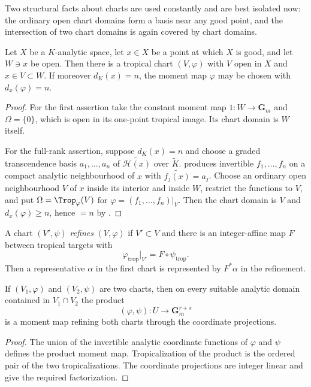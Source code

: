 Two structural facts about charts are used constantly and are best isolated
now: the ordinary open chart domains form a basis near any good point,
and the intersection of two chart domains is again covered by chart domains.

\begin{lemma}
\label{lem:trop-charts-basis}
Let $X$ be a $K$-analytic space, let $x\in X$ be a point at which $X$ is
good, and let $W\ni x$ be open. Then there is a tropical chart
$(V,\varphi)$ with $V$ open in $X$ and $x\in V\subset W$. If moreover
$d_K(x)=n$, the moment map
$\varphi$ may be chosen with $d_x(\varphi)=n$.
\end{lemma}

\begin{proof}
For the first assertion take the constant moment map $1:W\to\mathbf G_m$
and $\Omega=\{0\}$, which is open in its one-point tropical image. Its
chart domain is $W$ itself.

For the full-rank assertion, suppose $d_K(x)=n$ and choose a graded transcendence
basis $a_1,\ldots,a_n$ of $\widetilde{\mathcal H(x)}$ over $\widetilde K$.
 produces invertible
$f_1,\ldots,f_n$ on a compact analytic neighbourhood of $x$ with
$\widetilde{f_j(x)}=a_j$. Choose an ordinary open neighbourhood $V$ of $x$
inside its interior and inside $W$, restrict the functions to $V$, and put
$\Omega=\Trop_\varphi(V)$ for $\varphi=(f_1,\ldots,f_n)|_V$. Then the
chart domain is $V$ and $d_x(\varphi)\ge n$, hence $=n$ by
.
\end{proof}

\begin{definition}
\label{def:trop-chart-refinement}
A chart $(V',\psi)$ \emph{refines} $(V,\varphi)$ if $V'\subset V$ and there is
an integer-affine map $F$ between tropical targets with
\[
                         \varphi_{\mathrm{trop}}|_{V'}
                         =F\circ\psi_{\mathrm{trop}}.
\]
Then a representative $\alpha$ in the first chart is represented by
$F^*\alpha$ in the refinement.
\end{definition}

\begin{lemma}\label{lem:product-moment-map}
If $(V_1,\varphi)$ and $(V_2,\psi)$ are two charts, then on every suitable
analytic domain contained in $V_1\cap V_2$ the product
\[
                     (\varphi,\psi):U\longrightarrow\mathbf G_m^{r+s}
\]
is a moment map refining both charts through the coordinate projections.
\end{lemma}
\begin{proof}
The union of the invertible analytic coordinate functions of $\varphi$ and
$\psi$ defines the product moment map. Tropicalization of the product is the
ordered pair of the two tropicalizations. The coordinate projections are
integer linear and give the required factorization.
\end{proof}

